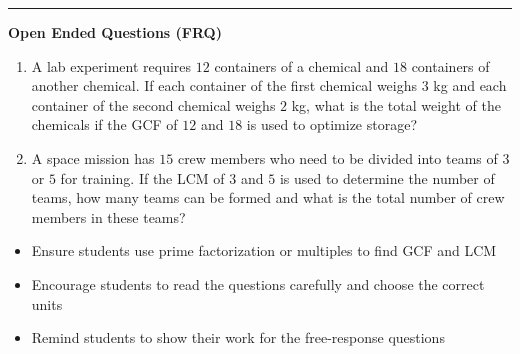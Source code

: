 \documentclass[10pt]{article}
\begin{document}
\vspace{-0.2cm}
\hrule
\vspace{0.2cm}
\textbf{\small Open Ended Questions (FRQ)}
\begin{enumerate}[label=\textbf{Q\arabic*.}, start=9, itemsep=5pt, topsep=0pt]

  \item \small A lab experiment requires $12$ containers of a chemical and $18$ containers of another chemical. If each container of the first chemical weighs $3$ kg and each container of the second chemical weighs $2$ kg, what is the total weight of the chemicals if the GCF of $12$ and $18$ is used to optimize storage? \vspace{2cm}

  \item \small A space mission has $15$ crew members who need to be divided into teams of $3$ or $5$ for training. If the LCM of $3$ and $5$ is used to determine the number of teams, how many teams can be formed and what is the total number of crew members in these teams? \vspace{2cm}

\end{enumerate}

\vfill

\begin{tcolorbox}[colback=blue!5, colframe=mainblue!50, title=\small \textbf{Chef's Tips}, fonttitle=\bfseries, bottom=1mm]
\begin{itemize}[noitemsep, topsep=2pt, leftmargin=0.5cm]
  \item \scriptsize Ensure students use prime factorization or multiples to find GCF and LCM\item \scriptsize Encourage students to read the questions carefully and choose the correct units\item \scriptsize Remind students to show their work for the free-response questions
\end{itemize}
\end{tcolorbox}
\end{document}
